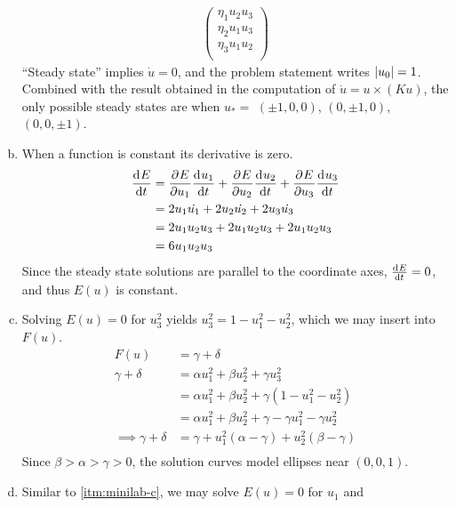 \documentclass[12pt]{article}
\begin{document}
\begin{enumerate}[(a)]
\begin{equation*}
\begin{aligned}
\begin{pmatrix}
        \eta_1u_2u_3 \\
        \eta_2u_1u_3 \\
        \eta_3u_1u_2 \\
      \end{pmatrix}
    \end{aligned}
  \end{equation*}
  ``Steady state'' implies $\dot{u}=0$, and the problem statement writes
  $\left|{u_0}\right|=1$. Combined with the result obtained in the computation of
  $\dot{u}=u\times(Ku)$, the only possible steady states are when $u_*=$
  $(\pm1,0,0)$, $(0,\pm1,0)$, $(0,0,\pm1)$.
\item When a function is constant its derivative is zero.
  \begin{equation*}
    \begin{aligned}
      \frac{\mathrm{d}^{} {E}}{\mathrm{d}{t}^{}} &= \frac{\partial^{} {E}}{\partial {u_1}^{}}\frac{\mathrm{d}^{} {u_1}}{\mathrm{d}{t}^{}} + \frac{\partial^{} {E}}{\partial {u_2}^{}}\frac{\mathrm{d}^{} {u_2}}{\mathrm{d}{t}^{}} + \frac{\partial^{} {E}}{\partial {u_3}^{}}\frac{\mathrm{d}^{} {u_3}}{\mathrm{d}{t}^{}} \\
      &= 2u_1\dot{u_1} + 2u_2\dot{u_2} + 2u_3\dot{u_3} \\
      &= 2u_1u_2u_3 + 2u_1u_2u_3 + 2u_1u_2u_3 \\
      &= 6u_1u_2u_3 \\
    \end{aligned}
  \end{equation*}
  Since the steady state solutions are parallel to the coordinate axes,
  $\frac{\mathrm{d}^{} {E}}{\mathrm{d}{t}^{}}=0$, and thus $E(u)$ is constant. 
\item \label{itm:minilab-c} Solving $E(u)=0$ for $u_3^2$ yields $u_3^2=1-u_1^2-u_2^2$, which we may
  insert into $F(u)$.
  \begin{equation*}
    \begin{aligned}
      F(u) &= \gamma + \delta \\
      \gamma + \delta &= \alpha u_1^2+\beta u_2^2+\gamma u_3^2 \\
      &= \alpha u_1^2+\beta u_2^2+\gamma (1-u_1^2-u_2^2) \\
      &= \alpha u_1^2+\beta u_2^2+\gamma - \gamma u_1^2 - \gamma u_2^2 \\
      \implies \gamma + \delta &= \gamma + u_1^2(\alpha-\gamma) + u_2^2(\beta-\gamma) \\
    \end{aligned}
  \end{equation*}
  Since $\beta>\alpha>\gamma>0$, the solution curves model ellipses near $(0,0,1)$.
\item Similar to \cref{itm:minilab-c}, we may solve $E(u)=0$ for $u_1$ and

\end{enumerate}
\end{document}

